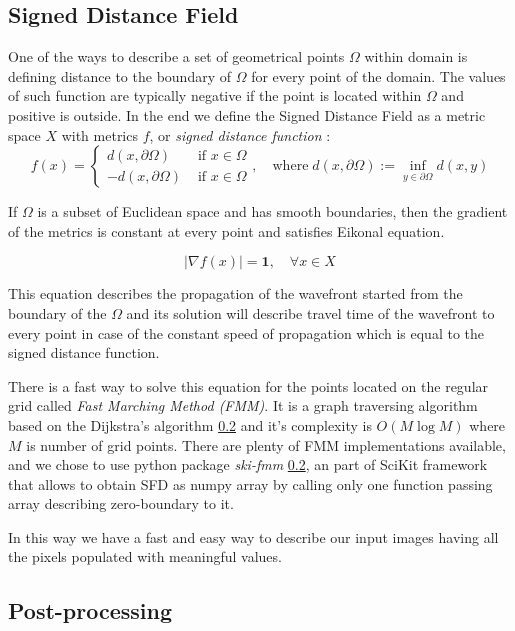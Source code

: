 \subsection{Signed Distance Field}

One of the ways to describe a set of geometrical points $\Omega$ within domain is defining distance to the boundary of $\Omega$ for every point of the domain. 
The values of such function are typically negative if the point is located within $\Omega$ and positive is outside.
In the end we define the Signed Distance Field as a metric space $X$ with metrics $f$, or \textit{signed distance function} :    
\[ 
f(x) = 
	\begin{cases}
			d(x, \partial \Omega) & \mbox{ if } x\in\Omega  \\
			-d(x, \partial \Omega) & \mbox{ if } x\in\Omega 
	\end{cases} 
	, \quad \mathrm{where} \; d(x, \partial \Omega) := \inf_{y \in \partial \Omega}d(x, y)
\]

If $\Omega$ is a subset of Euclidean space and has smooth boundaries, then the gradient of the metrics is constant at every point and satisfies Eikonal equation.

\[
 |\nabla f(x)| = \mathbf{1}, \quad \forall x \in X
\]

This equation describes the propagation of the wavefront started from the boundary of the $\Omega$ and its solution will describe travel time of the wavefront to every point in case of the constant speed of propagation which is equal to the signed distance function.
\medskip

There is a fast way to solve this equation for the points located on the regular grid called \textit{Fast Marching Method (FMM)}.
It is a graph traversing algorithm based on the Dijkstra's algorithm \ref{} and it's complexity is $O(M \log M)$ where $M$ is number of grid points.
There are plenty of FMM implementations available, and we chose to use python package \textit{ski-fmm} \ref{}, an part of SciKit framework that allows to obtain SFD as numpy array by calling only one function passing array describing zero-boundary to it.
\medskip

In this way we have a fast and easy way to describe our input images having all the pixels populated with meaningful values.

 
\subsection{Post-processing}

